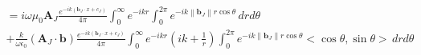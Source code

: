 \documentclass{article}
\newcommand{\norm}[1]{\left\lVert #1 \right\rVert}
\theoremstyle{plain}
\begin{document}
\begin{multline}
	=i\omega\mu_0 \mathbf{A}_J\frac{e^{-ik(\mathbf{b}_J\cdot x + c_J)}}{4\pi}
	\int_0^\infty e^{-ikr} \int_0^{2\pi} e^{-ik\norm{\mathbf{b}_J}r\cos{\theta}} \,drd\theta \\
	+ \frac{k}{\omega\epsilon_0}(\mathbf{A}_J\cdot\mathbf{b})\frac{e^{-ik(\mathbf{b}_J\cdot x + c_J)}}{4\pi}
	\int_0^\infty e^{-ikr}\left( ik + \frac{1}{r} \right) \int_0^{2\pi} e^{-ik\norm{\mathbf{b}_J}r\cos{\theta}} <\cos{\theta},\sin{\theta}> \,drd\theta
\end{multline}










\end{document}
